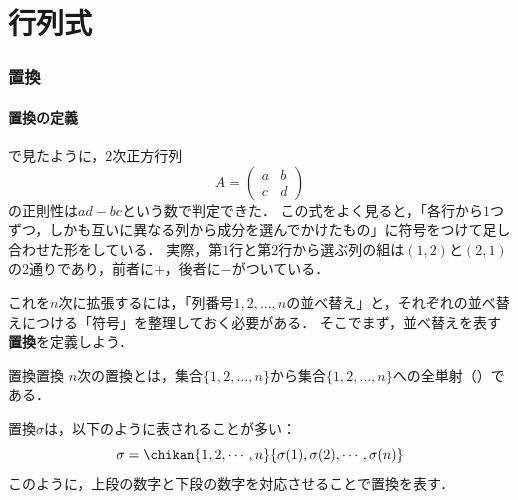 \part{行列式}

\begin{abstract}
  この章では，正方行列に対してひとつの数を対応させる\textbf{行列式}を定義する．
  では，$2$次正方行列が正則かどうかが$ad - bc$という数で判定できることを見た．
  この「判定のための数」を一般の$n$次正方行列に拡張したものが行列式である．
  まず準備として，$n$個の文字の並べ替えを表す\textbf{置換}とその\textbf{符号}を導入し，
  それを用いて行列式を成分で定義する．
  次に，行列式の基本性質である多重線型性・交代性を調べ，行列式が正則性や階数と深く結びついていることを示す．
  最後に，行列式を次数の低い行列式へと帰着させる\textbf{余因子展開}を導き，逆行列の公式とクラメールの公式を得る．
\end{abstract}

\section{置換}

\subsection{置換の定義}

で見たように，$2$次正方行列
\[
  A = \begin{pmatrix} a & b \\ c & d \end{pmatrix}
\]
の正則性は$ad - bc$という数で判定できた．
この式をよく見ると，「各行から$1$つずつ，しかも互いに異なる列から成分を選んでかけたもの」に符号をつけて足し合わせた形をしている．
実際，第$1$行と第$2$行から選ぶ列の組は$(1, 2)$と$(2, 1)$の$2$通りであり，前者に$+$，後者に$-$がついている．

これを$n$次に拡張するには，「列番号$1, 2, \dots, n$の並べ替え」と，それぞれの並べ替えにつける「符号」を整理しておく必要がある．
そこでまず，並べ替えを表す\textbf{置換}を定義しよう．

\begin{definition}{置換}{置換}
  $n$次の置換とは，集合$\{1, 2, \dots, n\}$から集合$\{1, 2, \dots, n\}$への全単射（）である．
  
  置換$\sigma$は，以下のように表されることが多い：
  \[
  \sigma = \chikan{1, 2, \cdots, n}{\sigma(1), \sigma(2), \cdots, \sigma(n)}
  \]
  このように，上段の数字と下段の数字を対応させることで置換を表す．
\end{definition}

